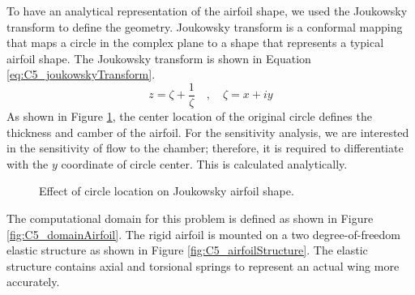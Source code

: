 To have an analytical representation of the airfoil shape, we used the Joukowsky transform to define the geometry. Joukowsky transform is a conformal mapping that maps a circle in the complex plane to a shape that represents a typical airfoil shape. The Joukowsky transform is shown in Equation \eqref{eq:C5_joukowskyTransform}.
%
\begin{equation}\label{eq:C5_joukowskyTransform}
	z = \zeta + \frac{1}{\zeta} \quad , \quad \zeta = x + iy
\end{equation}
%
As shown in Figure \ref{fig:C5_joukowskyAirfoil}, the center location of the original circle defines the thickness and camber of the airfoil. For the sensitivity analysis, we are interested in the sensitivity of flow to the chamber; therefore, it is required to differentiate with the $y$ coordinate of circle center. This is calculated analytically.
%
\begin{figure}[H]
    \centering
    \quad
    \quad
    \caption{Effect of circle location on Joukowsky airfoil shape.}
    \label{fig:C5_joukowskyAirfoil}
\end{figure}
%
The computational domain for this problem is defined as shown in Figure \ref{fig:C5_domainAirfoil}. The rigid airfoil is mounted on a two degree-of-freedom elastic structure as shown in Figure \ref{fig:C5_airfoilStructure}. The elastic structure contains axial and torsional springs to represent an actual wing more accurately.
